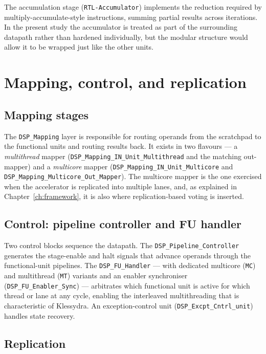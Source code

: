 The accumulation stage (\texttt{RTL-Accumulator}) implements the reduction
required by multiply-accumulate-style instructions, summing partial results
across iterations. In the present study the accumulator is treated as part of
the surrounding datapath rather than hardened individually, but the modular
structure would allow it to be wrapped just like the other units.

\section{Mapping, control, and replication}
\label{sec:arch-mapping}

\subsection{Mapping stages}

The \texttt{DSP\_Mapping} layer is responsible for routing operands from the
scratchpad to the functional units and routing results back. It exists in two
flavours --- a \emph{multithread} mapper
(\texttt{DSP\_Mapping\_IN\_Unit\_Multithread} and the matching out-mapper) and a
\emph{multicore} mapper (\texttt{DSP\_Mapping\_IN\_Unit\_Multicore} and
\texttt{DSP\_Mapping\_Multicore\_Out\_Mapper}). The multicore mapper is the one
exercised when the accelerator is replicated into multiple lanes, and, as
explained in Chapter~\ref{ch:framework}, it is also where replication-based
voting is inserted.

\subsection{Control: pipeline controller and FU handler}

Two control blocks sequence the datapath. The \texttt{DSP\_Pipeline\_Controller}
generates the stage-enable and halt signals that advance operands through the
functional-unit pipelines. The \texttt{DSP\_FU\_Handler} --- with dedicated
multicore (\texttt{MC}) and multithread (\texttt{MT}) variants and an enabler
synchroniser (\texttt{DSP\_FU\_Enabler\_Sync}) --- arbitrates which functional
unit is active for which thread or lane at any cycle, enabling the interleaved
multithreading that is characteristic of Klessydra. An exception-control unit
(\texttt{DSP\_Excpt\_Cntrl\_unit}) handles state recovery.

\subsection{Replication}

